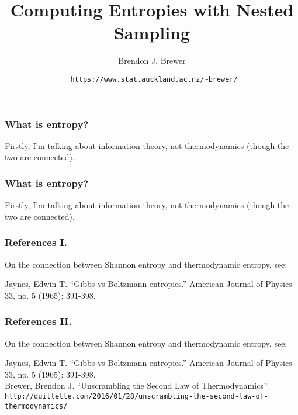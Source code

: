 \documentclass{beamer}
\title{Computing Entropies with Nested Sampling}
\author{Brendon J. Brewer}
\institute{Department of Statistics\\
The University of Auckland}
\date{{\tt \color{blue} https://www.stat.auckland.ac.nz/\~{ }brewer/}}
\begin{document}
\frame{\titlepage}


\begin{frame}
\frametitle{What is entropy?}

Firstly, I'm talking about information theory, not thermodynamics (though the
two are connected).

\end{frame}


\begin{frame}
\frametitle{What is entropy?}

Firstly, I'm talking about information theory, not thermodynamics (though the
two are connected).

\end{frame}




\begin{frame}
\frametitle{References I.}

On the connection between Shannon entropy and thermodynamic entropy,
see: \vspace{2em}

{\footnotesize Jaynes, Edwin T. ``Gibbs vs Boltzmann entropies.''
American Journal of Physics 33, no. 5 (1965): 391-398. \\
}

\end{frame}



\begin{frame}
\frametitle{References II.}

On the connection between Shannon entropy and thermodynamic entropy,
see: \vspace{2em}

{\footnotesize Jaynes, Edwin T. ``Gibbs vs Boltzmann entropies.''
American Journal of Physics 33, no. 5 (1965): 391-398. \\

Brewer, Brendon J. ``Unscrambling the Second Law of Thermodynamics''
{\color{blue} \tt
http://quillette.com/2016/01/28/unscrambling-the-second-law-of-thermodynamics/}
}

\end{frame}
\end{document}
